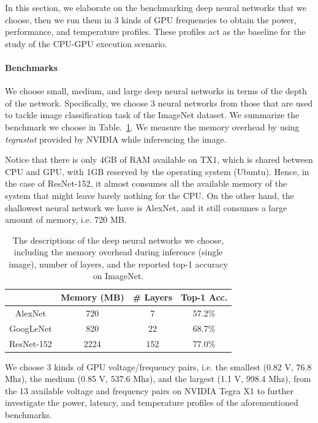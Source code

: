 In this section, we elaborate on the benchmarking deep neural networks that we choose, then we run them in 3 kinds of GPU frequencies to obtain the power, performance, and temperature profiles. These profiles act as the baseline for the study of the CPU-GPU execution scenario.

\paragraph{Benchmarks}

We choose small, medium, and large deep neural networks in terms of the depth of the network. Specifically, we choose 3 neural networks from those that are used to tackle image classification task of the ImageNet dataset. We summarize the benchmark we choose in Table.~\ref{table:1}. We measure the memory overhead by using \textit{tegrastat} provided by NVIDIA while inferencing the image.

Notice that there is only 4GB of RAM available on TX1, which is shared between CPU and GPU, with 1GB reserved by the operating system (Ubuntu). Hence, in the case of ResNet-152, it almost consumes all the available memory of the system that might leave barely nothing for the CPU. On the other hand, the shallowest neural network we have is AlexNet, and it still consumes a large amount of memory, i.e. 720 MB.


\begin{table}[h]
    \begin{center}
        \begin{tabular}{ | c | c | c | c | }
        \hline
        & Memory (MB) & \# Layers & Top-1 Acc. \\ \hline
        AlexNet{\cite{krizhevsky2012imagenet}} & 720 & 7 & 57.2\% \\ \hline
        GoogLeNet{\cite{szegedy2015going}} & 820 & 22 & 68.7\%  \\ \hline
        ResNet-152{\cite{he2016deep}} & 2224 & 152 & 77.0\% \\
        \hline
        \end{tabular}
    \end{center}
    \caption{The descriptions of the deep neural networks we choose, including the memory overhead during inference (single image), number of layers, and the reported top-1 accuracy on ImageNet.}\label{table:1}
\end{table}

We choose 3 kinds of GPU voltage/frequency pairs, i.e. the smallest (0.82 V, 76.8 Mhz), the medium (0.85 V, 537.6 Mhz), and the largest (1.1 V, 998.4 Mhz), from the 13 available voltage and frequency pairs on NVIDIA Tegra X1 to further investigate the power, latency, and temperature profiles of the aforementioned benchmarks.

